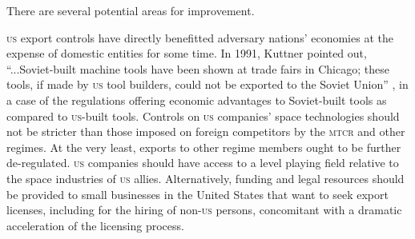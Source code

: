 \documentclass[preprint,twocolumn,5p]{elsarticle}
\begin{document}

There are several potential areas for improvement.

\textsc{us} export controls have directly benefitted adversary nations' economies at the expense of domestic entities for some time. In 1991, Kuttner pointed out, ``...Soviet-built machine tools have been shown at trade fairs in Chicago; these tools, if made by \textsc{us} tool builders, could not be exported to the Soviet Union'' \citep{Kuttner1991}, in a case of the regulations offering economic advantages to Soviet-built tools as compared to \textsc{us}-built tools. Controls on \textsc{us} companies' space technologies should not be stricter than those imposed on foreign competitors by the \textsc{mtcr} and other regimes. At the very least, exports to other regime members ought to be further de-regulated. \textsc{us} companies should have access to a level playing field relative to the space industries of \textsc{us} allies. Alternatively, funding and legal resources should be provided to small businesses in the United States that want to seek export licenses, including for the hiring of non-\textsc{us} persons, concomitant with a dramatic acceleration of the licensing process.
\end{document}
